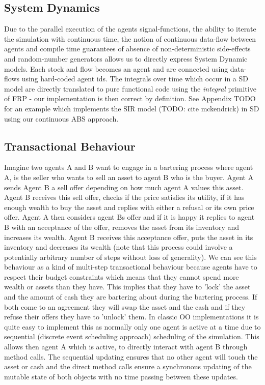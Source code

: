 \subsection{System Dynamics}
Due to the parallel execution of the agents signal-functions, the ability to iterate the simulation with continuous time, the notion of continuous data-flow between agents and compile time guarantees of absence of non-deterministic side-effects and random-number generators allows us to directly express System Dynamic models.
Each stock and flow becomes an agent and are connected using data-flows using hard-coded agent ids. The integrals over time which occur in a SD model are directly translated to pure functional code using the \textit{integral} primitive of FRP - our implementation is then correct by definition.
See Appendix TODO for an example which implements the SIR model (TODO: cite mckendrick) in SD using our continuous ABS approach.

\subsection{Transactional Behaviour}
Imagine two agents A and B want to engage in a bartering process where agent A, is the seller who wants to sell an asset to agent B who is the buyer. Agent A sends Agent B a sell offer depending on how much agent A values this asset. Agent B receives this sell offer, checks if the price satisfies its utility, if it has enough wealth to buy the asset and replies with either a refusal or its own price offer. Agent A then considers agent Bs offer and if it is happy it replies to agent B with an acceptance of the offer, removes the asset from its inventory and increases its wealth. Agent B receives this acceptance offer, puts the asset in its inventory and decreases its wealth (note that this process could involve a potentially arbitrary number of steps without loss of generality).
We can see this behaviour as a kind of multi-step transactional behaviour because agents have to respect their budget constraints which means that they cannot spend more wealth or assets than they have. This implies that they have to 'lock' the asset and the amount of cash they are bartering about during the bartering process. If both come to an agreement they will swap the asset and the cash and if they refuse their offers they have to 'unlock' them.
In classic OO implementations it is quite easy to implement this as normally only one agent is active at a time due to sequential (discrete event scheduling approach) scheduling of the simulation. This allows then agent A which is active, to directly interact with agent B through method calls. The sequential updating ensures that no other agent will touch the asset or cash and the direct method calls ensure a synchronous updating of the mutable state of both objects with no time passing between these updates.

